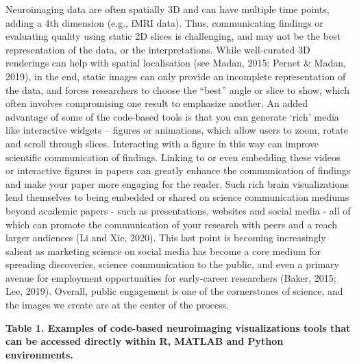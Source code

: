 \documentclass{article}
\begin{document}
Neuroimaging data are often spatially 3D and can have multiple time points, adding a 4th dimension (e.g., fMRI data). Thus, communicating findings or evaluating quality using static 2D slices is challenging, and may not be the best representation of the data, or the interpretations. While well-curated 3D renderings can help with spatial localisation (see Madan, 2015; Pernet \& Madan, 2019), in the end, static images can only provide an incomplete representation of the data, and forces researchers to choose the ``best'' angle or slice to show, which often involves compromising one result to emphasize another. An added advantage of some of the code-based tools is that you can generate `rich' media like interactive widgets -- figures or animations, which allow users to zoom, rotate and scroll through slices. Interacting with a figure in this way can improve scientific communication of findings. Linking to or even embedding these videos or interactive figures in papers can greatly enhance the communication of findings and make your paper more engaging for the reader. Such rich brain visualizations lend themselves to being embedded or shared on science communication mediums beyond academic papers - such as presentations, websites and social media - all of which can promote the communication of your research with peers and a reach larger audiences (Li and Xie, 2020). This last point is becoming increasingly salient as marketing science on social media has become a core medium for spreading discoveries, science communication to the public, and even a primary avenue for employment opportunities for early-career researchers (Baker, 2015; Lee, 2019). Overall, public engagement is one of the cornerstones of science, and the images we create are at the center of the process.

\hfill\break
\textbf{Table 1. Examples of code-based neuroimaging visualizations tools that can be accessed directly within R, MATLAB and Python environments.}
\end{document}
